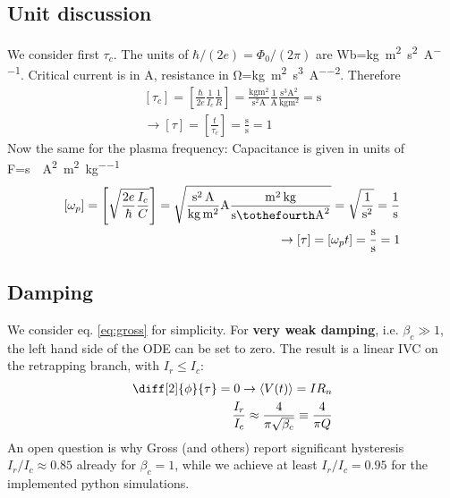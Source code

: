 \documentclass[reprint,onecolumn,%
amsmath,amssymb,aip,apl]{revtex4-1}
\begin{document}
	\subsection{Unit discussion}
	We consider first $\tau_c$.
	The units of $\hbar/(2e)=\Phi_0/(2\pi)$ are \si{Wb}=\si{\kilogram\meter\squared\per\second\squared\per\ampere}.
	Critical current is in \si{\ampere}, resistance in \si{\ohm}=\si{\kilogram\meter\squared\per\second\cubed\per\ampere\squared}.
	Therefore
	\begin{eqnarray}
	\left[\tau_c\right]=\left[\frac{\hbar}{2e}\frac{1}{I_c}\frac{1}{R}\right] = \frac{\si{\kilogram\meter\squared}}{\si{\second\squared\ampere}}\frac{1}{\si{\ampere}}\frac{\si{\second\cubed\ampere\squared}}{\si{\kilogram\meter\squared}} = \si{\second} \\%
	\rightarrow \left[\tau\right]=\left[\frac{t}{\tau_c}\right]=\frac{\si{\second}}{\si{\second}}=1
	\end{eqnarray}
	Now the same for the plasma frequency:
	Capacitance is given in units of \si{F}=\si{\second\tothefourth\ampere\squared\per\meter\squared\per\kilogram}
	\begin{eqnarray}
	\left[\omega_p\right]=\left[\sqrt{\frac{2e}{\hbar}\frac{I_c}{C}}\right]=\sqrt{\frac{\si{\second\squared\ampere}}{\si{\kilogram\meter\squared}}\si{\ampere}\frac{\si{\meter\squared\kilogram}}{\si{\second\tothefourth\ampere\squared}}}=\sqrt{\frac{1}{\si{\second\squared}}}=\frac{1}{\si{\second}} \\%
	\rightarrow \left[\tau\right]=\left[\omega_p t\right]=\frac{\si{\second}}{\si{\second}}=1
	\end{eqnarray}
	
	\subsection{Damping}
	We consider eq. \ref{eq:gross} for simplicity.
	For \textbf{very weak damping}, i.e. $\beta_c\gg1$, the left hand side of the ODE can be set to zero.
	The result is a linear IVC on the retrapping branch, with $I_r\leq I_c$:
	\begin{eqnarray}
	\diff[2]{\phi}{\tau}=0 \rightarrow \langle V(t)\rangle=IR_n \\%
	\frac{I_r}{I_c}\approx\frac{4}{\pi\sqrt{\beta_c}}\equiv\frac{4}{\pi Q}
	\end{eqnarray}
	An open question is why Gross (and others) report significant hysteresis $I_r/I_c\approx0.85$ already for $\beta_c=1$, while we achieve at least $I_r/I_c=0.95$ for the implemented python simulations.
	
\end{document}
